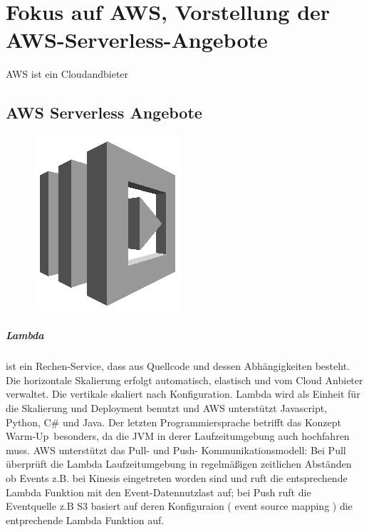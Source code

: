 \documentclass[
12pt,
english,
ngerman,
headsepline,
twoside,
openright,
numbers=noenddot,version=first
]{scrreprt}
\begin{document}
\chapter{Fokus auf AWS, Vorstellung der AWS-Serverless-Angebote}
\label{chap:aws-serverless}
\acrshort{AWS} ist ein Cloudandbieter

\section{AWS Serverless Angebote}
\begin{figure}
	\includegraphics[width=0.9\linewidth]{./pics/aws/Compute_GRAYSCALE_AWSLambda.eps}
\end{figure}
\paragraph{Lambda} ist ein Rechen-Service, dass aus Quellcode und dessen Abhängigkeiten besteht. Die horizontale Skalierung erfolgt automatisch, elastisch und vom Cloud Anbieter verwaltet. Die vertikale skaliert nach Konfiguration. Lambda wird als Einheit für die Skalierung und Deployment benutzt und \acrshort{AWS} unterstützt Javascript, Python, C\# und Java. Der letzten Programmiersprache betrifft das Konzept \glqq Warm-Up\grqq\ besonders, da die \acrfull{JVM} in derer Laufzeitumgebung auch hochfahren muss. AWS unterstützt das Pull- und Push- Kommunikationsmodell: Bei Pull überprüft die Lambda Laufzeitumgebung in regelmäßigen zeitlichen Abständen ob Events z.B. bei Kinesis eingetreten worden sind und ruft die entsprechende Lambda Funktion mit den Event-Datennutzlast auf; bei Push ruft die Eventquelle z.B S3 basiert auf deren Konfiguraion ( event source mapping ) die entprechende Lambda Funktion auf. 
\end{document}
